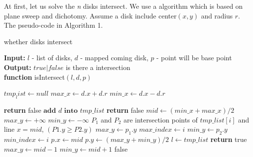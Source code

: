 \documentclass[10pt, conference, compsocconf]{IEEEtran}
\begin{document}
At first, let us solve the \textit{n} disks intersect. We use a algorithm which is based on plane sweep and dichotomy. Assume a disk include center$(x,y)$ and radius $r$. The pseudo-code in Algorithm 1.
\begin{algorithm}
    \caption{whether disks intersect}
    \begin{flushleft}
        \textbf{Input:} $l$ - list of disks, $d$ - mapped coming disk, $p$ - point will be base point\\
        \textbf{Output:} $true|false$  is there a intersection\\ 
        \textbf{function} isIntersect$(l, d, p)$
    \end{flushleft}
    \begin{algorithmic}[1]
        \STATE $tmp_list \gets null$
        \STATE $max\_x\gets d.x+d.r$
        \STATE $min\_x\gets d.x-d.r$
        
                \STATE \textbf{return} false
            \ENDIF
        \ENDFOR
        \STATE $\textbf{add } d \textbf{ into } tmp\_list$
            \STATE \textbf{return} false
        \ENDIF
            \STATE $mid \gets (min\_x + max\_x)/2$
            \STATE $max\_y \gets +\infty$
            \STATE $min\_y \gets -\infty$
                \STATE $P_1$ and $P_2$ are intersection points of $tmp\_list[i]$ and line $x=mid$, $(P1.y\geqslant P2.y)$
                    \STATE $max\_y \gets p_1.y$
                    \STATE $max\_index \gets i$
                \ENDIF
                    \STATE $min\_y \gets p_2.y$
                    \STATE $min\_index \gets i$
                \ENDIF
            \ENDFOR
                \STATE $p.x \gets mid$
                \STATE $p.y \gets (max\_y+min\_y)/2$
                \STATE $l \gets tmp\_list$
                \STATE \textbf{return} true
            \ENDIF
                \STATE $max\_y \gets mid-1$
                \STATE $min\_y \gets mid+1$
            \ENDIF
        \ENDWHILE
        \RETURN false
    \end{algorithmic}
\end{algorithm}
\end{document}
